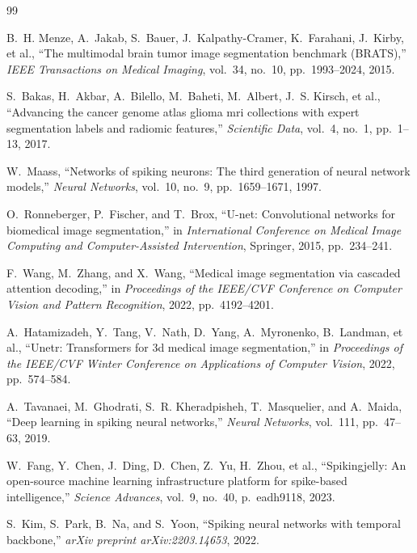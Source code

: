 \documentclass[12pt,a4paper]{article}
\begin{document}
\begin{thebibliography}{99}

B.~H. Menze, A.~Jakab, S.~Bauer, J.~Kalpathy-Cramer, K.~Farahani, J.~Kirby, et al., ``The multimodal brain tumor image segmentation benchmark (BRATS),'' \textit{IEEE Transactions on Medical Imaging}, vol.~34, no.~10, pp.~1993--2024, 2015.

S.~Bakas, H.~Akbar, A.~Bilello, M.~Baheti, M.~Albert, J.~S. Kirsch, et al., ``Advancing the cancer genome atlas glioma mri collections with expert segmentation labels and radiomic features,'' \textit{Scientific Data}, vol.~4, no.~1, pp.~1--13, 2017.

W.~Maass, ``Networks of spiking neurons: The third generation of neural network models,'' \textit{Neural Networks}, vol.~10, no.~9, pp.~1659--1671, 1997.

O.~Ronneberger, P.~Fischer, and T.~Brox, ``U-net: Convolutional networks for biomedical image segmentation,'' in \textit{International Conference on Medical Image Computing and Computer-Assisted Intervention}, Springer, 2015, pp.~234--241.

F.~Wang, M.~Zhang, and X.~Wang, ``Medical image segmentation via cascaded attention decoding,'' in \textit{Proceedings of the IEEE/CVF Conference on Computer Vision and Pattern Recognition}, 2022, pp.~4192--4201.

A.~Hatamizadeh, Y.~Tang, V.~Nath, D.~Yang, A.~Myronenko, B.~Landman, et al., ``Unetr: Transformers for 3d medical image segmentation,'' in \textit{Proceedings of the IEEE/CVF Winter Conference on Applications of Computer Vision}, 2022, pp.~574--584.

A.~Tavanaei, M.~Ghodrati, S.~R. Kheradpisheh, T.~Masquelier, and A.~Maida, ``Deep learning in spiking neural networks,'' \textit{Neural Networks}, vol.~111, pp.~47--63, 2019.

W.~Fang, Y.~Chen, J.~Ding, D.~Chen, Z.~Yu, H.~Zhou, et al., ``Spikingjelly: An open-source machine learning infrastructure platform for spike-based intelligence,'' \textit{Science Advances}, vol.~9, no.~40, p.~eadh9118, 2023.

S.~Kim, S.~Park, B.~Na, and S.~Yoon, ``Spiking neural networks with temporal backbone,'' \textit{arXiv preprint arXiv:2203.14653}, 2022.


\end{thebibliography}
\end{document}

